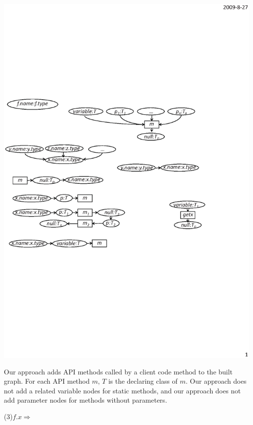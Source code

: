 \begin{center}
\includegraphics[scale=0.7,clip]{figure/rule2.eps}%
\end{center}


Our approach adds API methods called by a client code method to the
built graph. For each API method $m$, $T$ is the declaring class of
$m$. Our approach does not add a related variable nodes for static
methods, and our approach does not add parameter nodes for methods
without parameters.

(3)$f.x \Rightarrow $

